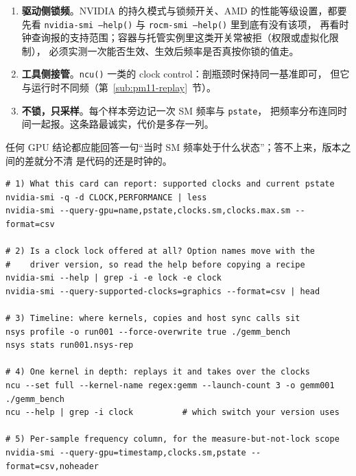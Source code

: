 \documentclass[12pt,a4paper,fontset=fandol]{ctexbook}
\newcommand{\Fn}[1]{\texttt{#1()}}
\newcommand{\Tp}[1]{\texttt{#1}}
\begin{document}
\begin{enumerate}
  \item \textbf{驱动侧锁频}。NVIDIA 的持久模式与锁频开关、AMD 的性能等级设置，都要先看
        \Fn{nvidia-smi --help} 与 \Fn{rocm-smi --help} 里到底有没有该项，
        再看时钟查询报的支持范围；容器与托管实例里这类开关常被拒（权限或虚拟化限制），
        必须实测一次能否生效、生效后频率是否真按你锁的值走。
  \item \textbf{工具侧接管}。\Fn{ncu} 一类的 clock control：剖瓶颈时保持同一基准即可，
        但它与运行时不同频（第~\ref{sub:pm11-replay}~节）。
  \item \textbf{不锁，只采样}。每个样本旁边记一次 SM 频率与 \Tp{pstate}，
        把频率分布连同时间一起报。这条路最诚实，代价是多存一列。
\end{enumerate}

任何 GPU 结论都应能回答一句``当时 SM 频率处于什么状态''；答不上来，版本之间的差就分不清
是代码的还是时钟的。

\begin{lstlisting}[style=shellstyle, caption={GPU 计时前后的命令形态（字段与支持项以本机 --help 输出为准；本仓库无 GPU，此处仅示意）}, label={lst:pm11-cmds}]
# 1) What this card can report: supported clocks and current pstate
nvidia-smi -q -d CLOCK,PERFORMANCE | less
nvidia-smi --query-gpu=name,pstate,clocks.sm,clocks.max.sm --format=csv

# 2) Is a clock lock offered at all? Option names move with the
#    driver version, so read the help before copying a recipe
nvidia-smi --help | grep -i -e lock -e clock
nvidia-smi --query-supported-clocks=graphics --format=csv | head

# 3) Timeline: where kernels, copies and host sync calls sit
nsys profile -o run001 --force-overwrite true ./gemm_bench
nsys stats run001.nsys-rep

# 4) One kernel in depth: replays it and takes over the clocks
ncu --set full --kernel-name regex:gemm --launch-count 3 -o gemm001 ./gemm_bench
ncu --help | grep -i clock          # which switch your version uses

# 5) Per-sample frequency column, for the measure-but-not-lock scope
nvidia-smi --query-gpu=timestamp,clocks.sm,pstate --format=csv,noheader
\end{lstlisting}
\end{document}
